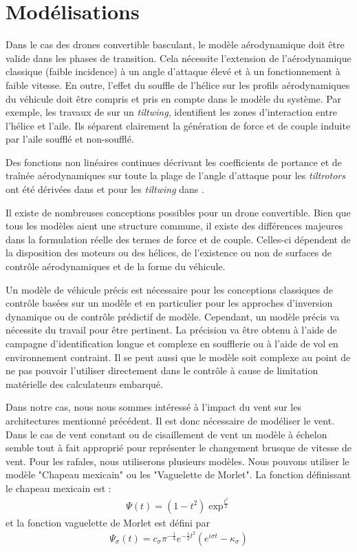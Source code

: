 \section{Modélisations}
Dans le cas des drones convertible basculant, le modèle aérodynamique doit être valide dans les phases de transition. Cela nécessite l'extension de l'aérodynamique classique (faible incidence) à un angle d'attaque élevé et à un fonctionnement à faible vitesse. En outre, l'effet du souffle de l'hélice sur les profils aérodynamiques du véhicule doit être compris et pris en compte dans le modèle du système. Par exemple, les travaux de \cite{9444145} sur un \textit{tiltwing}, identifient les zones d'interaction entre l'hélice et l'aile. Ils séparent clairement la génération de force et de couple induite par l'aile soufflé et non-soufflé.

Des fonctions non linéaires continues décrivant les coefficients de portance et de traînée aérodynamiques sur toute la plage de l'angle d'attaque pour les  \textit{tiltrotors} ont été dérivées dans \cite{6981467} et pour les \textit{tiltwing} dans \cite{lustosaHal-03035938,Lustosa2017LaP}.

Il existe de nombreuses conceptions possibles pour un drone convertible. Bien que tous les modèles aient une structure commune, il existe des différences majeures dans la formulation réelle des termes de force et de couple. Celles-ci dépendent de la disposition des moteurs ou des hélices, de l'existence ou non de surfaces de contrôle aérodynamiques et de la forme du véhicule.

Un modèle de véhicule précis est nécessaire pour les conceptions classiques de contrôle basées sur un modèle et en particulier pour les approches d'inversion dynamique ou de contrôle prédictif de modèle. Cependant, un modèle précis va nécessite du travail pour être pertinent. La précision va être obtenu à l'aide de campagne d'identification longue et complexe en soufflerie ou à l'aide de vol en environnement contraint. Il se peut aussi que le modèle soit complexe au point de ne pas pouvoir l'utiliser directement dans le contrôle à cause de limitation matérielle des calculateurs embarqué.


Dans notre cas, nous nous sommes intéressé à l'impact du vent sur les architectures mentionné précédent. Il est donc nécessaire de modéliser le vent. Dans le cas de vent constant ou de cisaillement de vent un modèle à échelon semble tout à fait approprié pour représenter le changement brusque de vitesse de vent. 
Pour les rafales, nous utiliserons plusieurs modèles. Nous pouvons utiliser le modèle "Chapeau mexicain" ou les "Vaguelette de Morlet".
La fonction définissant le chapeau mexicain est :
\begin{align}
    \Psi(t)= (1-t^{2})\exp^{\frac{t^{2}}{2}}
\end{align}
et la fonction vaguelette de Morlet est défini par 
\begin{align}
    \Psi _{\sigma }(t)=c_{\sigma }\pi ^{-{\frac {1}{4}}}e^{-{\frac {1}{2}}t^{2}}(e^{i\sigma t}-\kappa _{\sigma })
\end{align}


